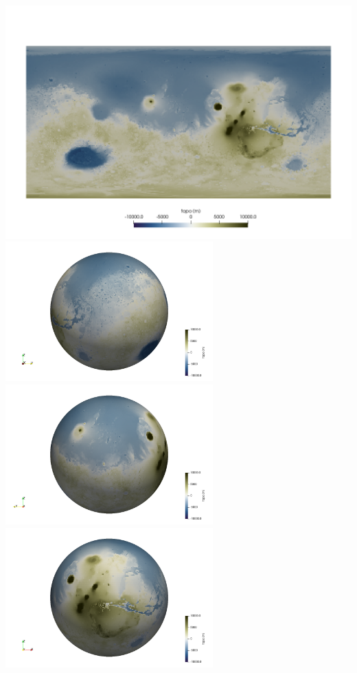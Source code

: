 \begin{center}
\includegraphics[width=15cm]{python_codes/fieldstone_100/images/topo2D}\\
\includegraphics[width=8cm]{python_codes/fieldstone_100/images/topo3Da}
\includegraphics[width=8cm]{python_codes/fieldstone_100/images/topo3Db}\\
\includegraphics[width=8cm]{python_codes/fieldstone_100/images/topo3Dc}

\end{center}

